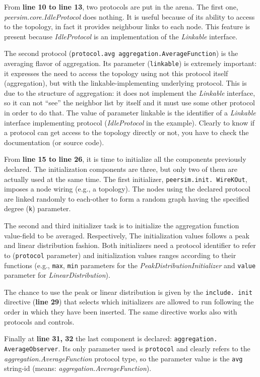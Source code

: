 \documentclass[a4paper,11pt]{article}
\begin{document}
From \textbf{line 10 to line 13}, two protocols are put in the arena.
The first one, \emph{peersim.core.IdleProtocol} does nothing. It is useful
because of its ability to access to the topology, in fact it provides
neighbour links to each node. This feature is present because \emph{IdleProtocol}
is an implementation of the \emph{Linkable} interface. 

The second protocol (\texttt{protocol.avg aggregation.AverageFunction})
is the averaging flavor of aggregation. Its parameter (\texttt{linkable})
is extremely important: it expresses the need to access the topology
using not this protocol itself (aggregation), but with the
linkable-implementing underlying protocol. This is due to the structure
of aggregation: it does not implement the \emph{Linkable} interface,
so it can not ``see'' the neighbor list by itself and it must use some other
protocol in order to do that. The value of parameter linkable is the identifier
of a \emph{Linkable} interface implementing protocol (\emph{IdleProtocol}
in the example). Clearly to know if a protocol can get access to the
topology directly or not, you have to check the documentation (or source
code).

From \textbf{line 15 to line 26}, it is time to initialize all the
components previously declared. The initialization components
are three, but only two of them are actually used at the same
time. The first initializer, \texttt{peersim.init. WireKOut},
imposes a node wiring (e.g., a topology). The nodes using the declared
protocol are linked
randomly to each-other to form a random graph having the specified
degree (\texttt{k}) parameter. 

The second and third initializer task is to initialize the aggregation
function value-field to be averaged. Respectively, The initialization
values follows a peak and linear
distribution fashion. Both initializers need a protocol identifier to
refer to (\texttt{protocol} parameter) and initialization values
ranges according to their functions (e.g., \texttt{max}, \texttt{min}
parameters 
for the \emph{PeakDistributionInitializer} and \texttt{value}
parameter for \emph{LinearDistribution}). 

The chance to use the peak or linear distribution is given by the
\texttt{include. init} directive (\textbf{line 29}) that selects which
initializers are 
allowed to run following the order in which they have been
inserted. The same directive works also with protocols and controls.

Finally at \textbf{line 31, 32} the last component is declared:
\texttt{aggregation. AverageObserver}. Its only parameter used is \texttt{protocol} and clearly refers to the
\emph{aggregation.AverageFunction} protocol type, so the parameter
value is the \texttt{avg} string-id (means: \emph{aggregation.AverageFunction}). 
\end{document}
